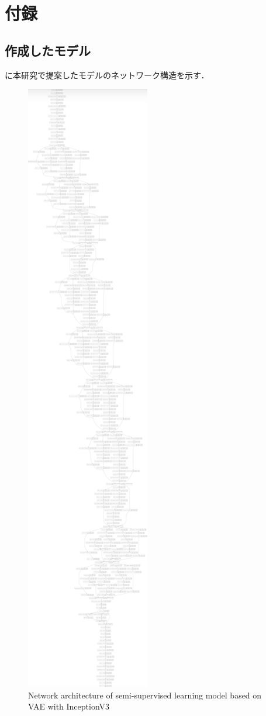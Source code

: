 \chapter*{付録}
\setcounter{chapter}{1}
\setcounter{section}{0}
\renewcommand{\thechapter}{\Alph{chapter}}

\section{作成したモデル}
に本研究で提案したモデルのネットワーク構造を示す．

\begin{figure}[H]
	\centering
	\includegraphics[height=0.9\textheight]{fig/vae_mlp_un_label_v2_tiny}
	\caption{Network architecture of semi-supervised learning model based on VAE with InceptionV3}
	\label{fig:semiVAEmodel}
\end{figure}


